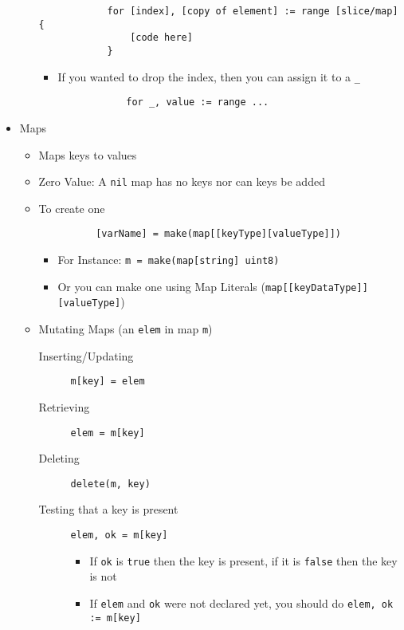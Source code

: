 \documentclass[11pt, oneside]{article}   	%
\begin{document}
\begin{itemize}
\begin{itemize}
          \begin{verbatim}
            for [index], [copy of element] := range [slice/map] {
                [code here]
            }
          \end{verbatim}
          \begin{itemize}
            \item If you wanted to drop the index, then you can assign it to a \texttt{\_}
            \begin{verbatim}
            for _, value := range ...
            \end{verbatim}
          \end{itemize}
      \end{itemize}
    \item Maps \label{Maps}
      \begin{itemize}
        \item Maps keys to values
        \item Zero Value: A \texttt{nil} map has no keys nor can keys be added
        \item To create one
        \begin{verbatim}
          [varName] = make(map[[keyType][valueType]])
        \end{verbatim}
        \begin{itemize}
          \item For Instance: \texttt{m = make(map[string] uint8)}
          \item Or you can make one using Map Literals (\texttt{map[[keyDataType]] [valueType]})
        \end{itemize}
        \item Mutating Maps (an \texttt{elem} in map \texttt{m})
          \begin{description}
            \item[Inserting/Updating] \texttt{m[key] = elem}
            \item[Retrieving] \texttt{elem = m[key]}
            \item[Deleting] \texttt{delete(m, key)}
            \item[Testing that a key is present] \texttt{elem, ok = m[key]}
              \begin{itemize}
                 \item If \texttt{ok} is \texttt{true} then the key is present, if it is \texttt{false} then the key is not
                 \item If \texttt{elem} and \texttt{ok} were not declared yet, you should do \texttt{elem, ok := m[key]}

\end{itemize}
\end{description}
\end{itemize}
\end{itemize}
\end{document}
